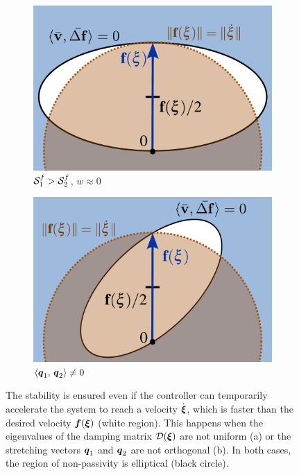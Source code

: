 \begin{figure}[htbp]
    \centering
    \begin{subfigure}{0.49\columnwidth}
      \centerline{\includegraphics[width=\textwidth]{figures/passivity_analysis_wide}}
	  \caption{$\mathcal{S}_1^f > \mathcal{S}_2^f$, $w \approx 0$}
	  \label{fig:passivity_analysis_wide}
    \end{subfigure}\hfill%
    \begin{subfigure}{0.49\columnwidth}
    \includegraphics[width=\textwidth]{figures/passivity_analysis_skew}
	\caption{$\left\langle {\boldsymbol{q}_1}, \, {\boldsymbol{q}_2} \right\rangle \neq 0$ }
      \label{fig:passivity_analysis_skew}
    \end{subfigure}
	\caption{
		The stability is ensured even if the controller can temporarily accelerate the system  to reach a velocity $\dot{\boldsymbol{\xi}}$, which is faster than the desired velocity $\boldsymbol{f}(\boldsymbol{\xi})$ (white region).
		This happens when the eigenvalues of the damping matrix $\mathcal{D}(\boldsymbol{\xi})$ are not uniform (a) or the stretching vectors $\boldsymbol{q}_1$ and $\boldsymbol{q}_2$ are not orthogonal (b). 
	In both cases, the region of non-passivity is elliptical (black circle).}
	\label{fig:passivity_analysis_varied}
\end{figure}



